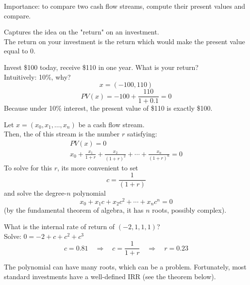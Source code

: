 Importance: to compare two cash flow streams, compute their present values and compare.

Captures the idea on the "return" on an investment.
\\The return on your investment is the return which would make the present value equal to 0.
\begin{example}
    Invest \$100 today, receive \$110 in one year. What is your return?
    \\Intuitively: 10\%, why?
    \[x = (-100, 110)\]
    \[PV(x) = -100 + \frac{110}{1+0.1} = 0\]
    Because under 10\% interest, the present value of \$110 is exactly \$100.
\end{example}

\begin{definition}
    Let $x = (x_0, x_1, \dots, x_n)$ be a cash flow stream. \\Then, the  of this stream is the number $r$ satisfying:
    \[\boxed{\begin{gathered}
        PV(x) = 0 \\
        x_0 + \frac{x_1}{1+r} + \frac{x_2}{(1+r)^2} + \cdots + \frac{x_n}{(1+r)^n} = 0
    \end{gathered}}\]
    To solve for this $r$, its more convenient to set 
    \[c = \frac{1}{(1+r)}\]
    and solve the degree-$n$ polynomial
    \[x_0 + x_1c+ x_2 c^2 + \cdots + x_n c^n = 0\]
    (by the fundamental theorem of algebra, it has $n$ roots, possibly complex).
\end{definition}

\begin{example}
    What is the internal rate of return of $(-2,1,1,1)$?
    \\Solve: $0 = -2 + c + c^2 + c^3$
    \[c = 0.81 \quad \Rightarrow \quad c = \frac{1}{1+r} \quad \Rightarrow \quad r = 0.23\]
\end{example}
The polynomial can have many roots, which can be a problem. Fortunately, most standard investments have a well-defined IRR (see the theorem below).

